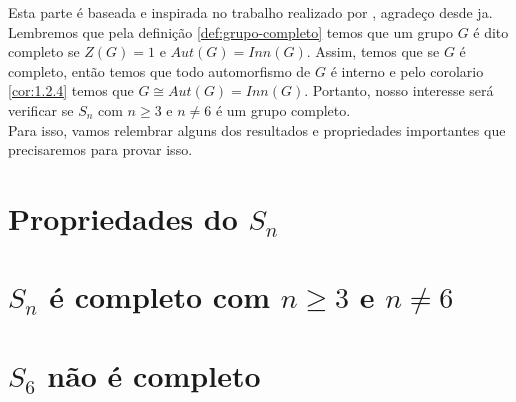 Esta parte é baseada e inspirada no trabalho realizado por \cite{Assis2018}, agradeço desde ja.\\



Lembremos que pela definição \ref{def:grupo-completo} temos que um grupo $G$ é dito completo  se $Z(G)=1$ e $Aut(G)=Inn(G)$. Assim, temos que se $G$ é completo, então temos que todo automorfismo de $G$ é interno e pelo corolario \ref{cor:1.2.4} temos que $G\cong Aut(G)=Inn(G)$.
Portanto, nosso interesse será verificar se $S_n$ com $n\geq 3$ e $n\neq 6$ é um grupo completo.\\

Para isso, vamos relembrar alguns dos resultados e propriedades importantes que precisaremos para provar isso.
\section{Propriedades do \texorpdfstring{$S_n$}{Sn}}

\section{\texorpdfstring{$S_n$}{Sn} é completo com \texorpdfstring{$n\geq 3$ e $n\neq 6$}{n<=3 e n=!6}}

\section{\texorpdfstring{$S_6$}{S6} não é completo}

